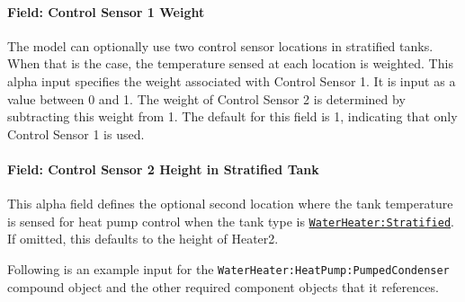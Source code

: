 \paragraph{Field: Control Sensor 1 Weight}\label{field-control-sensor-1-weight}

The model can optionally use two control sensor locations in stratified tanks. When that is the case, the temperature sensed at each location is weighted. This alpha input specifies the weight associated with Control Sensor 1. It is input as a value between 0 and 1. The weight of Control Sensor 2 is determined by subtracting this weight from 1. The default for this field is 1, indicating that only Control Sensor 1 is used.

\paragraph{Field: Control Sensor 2 Height in Stratified Tank}\label{field-control-sensor-2-height-in-stratified-tank}

This alpha field defines the optional second location where the tank temperature is sensed for heat pump control when the tank type is \hyperref[waterheaterstratified]{\lstinline!WaterHeater:Stratified!}. If omitted, this defaults to the height of Heater2.

Following is an example input for the \lstinline!WaterHeater:HeatPump:PumpedCondenser! compound object and the other required component objects that it references.

